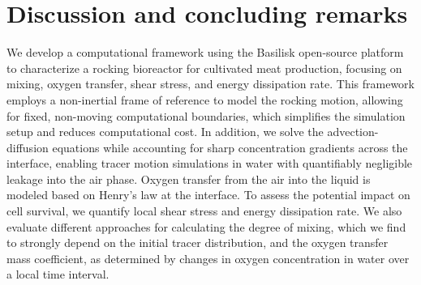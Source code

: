 \documentclass[final,3p,times,twocolumn,authoryear]{elsarticle}
\theoremstyle{definition}
\begin{document}


\section{Discussion and concluding remarks}

We develop a computational framework using the Basilisk open-source platform to characterize a rocking bioreactor for cultivated meat production, focusing on mixing, oxygen transfer, shear stress, and energy dissipation rate. This framework employs a non-inertial frame of reference to model the rocking motion, allowing for fixed, non-moving computational boundaries, which simplifies the simulation setup and reduces computational cost. In addition, we solve the advection-diffusion equations while accounting for sharp concentration gradients across the interface, enabling tracer motion simulations in water with quantifiably negligible leakage into the air phase. Oxygen transfer from the air into the liquid is modeled based on Henry's law at the interface. To assess the potential impact on cell survival, we quantify local shear stress and energy dissipation rate. We also evaluate different approaches for calculating the degree of mixing, which we find to strongly depend on the initial tracer distribution, and the oxygen transfer mass coefficient, as determined by changes in oxygen concentration in water over a local time interval.
\end{document}
